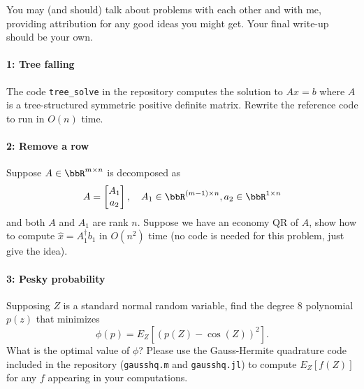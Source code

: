 \documentclass[12pt, leqno]{article} %
\begin{document}

You may (and should) talk about problems with each other and with me,
providing attribution for any good ideas you might get.  Your final
write-up should be your own.


\paragraph*{1: Tree falling}
The code {\tt tree\_solve} in the repository computes the solution to
$Ax = b$ where $A$ is a tree-structured symmetric positive definite
matrix.  Rewrite the reference code to run in $O(n)$ time.

\paragraph*{2: Remove a row}
Suppose $A \in \bbR^{m \times n}$ is decomposed as
\[
  A = \begin{bmatrix} A_1 \\ a_2 \end{bmatrix}, \quad
  A_1 \in \bbR^{(m-1) \times n}, a_2 \in \bbR^{1 \times n}
\]
and both $A$ and $A_1$ are rank $n$.
Suppose we have an economy QR of $A$, show how to compute
$\hat{x} = A_1^\dagger b_1$ in $O(n^2)$ time (no code is needed
for this problem, just give the idea).

\paragraph*{3: Pesky probability}
Supposing $Z$ is a standard normal random variable, find the degree 8
polynomial $p(z)$ that minimizes
\[
  \phi(p) = E_Z[(p(Z)-\cos(Z))^2].
\]
What is the optimal value of $\phi$?  Please use the Gauss-Hermite
quadrature code included in the repository ({\tt gausshq.m} and
{\tt gausshq.jl}) to compute $E_Z[f(Z)]$ for any $f$ appearing in your
computations.
\end{document}
